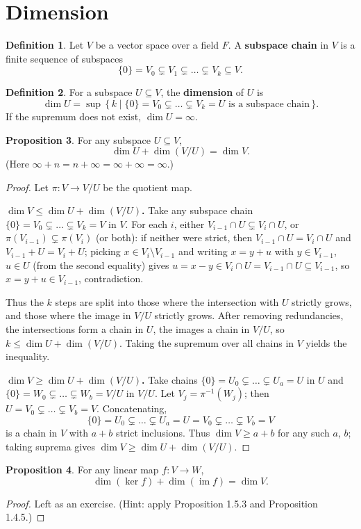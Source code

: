 \documentclass{book}
\theoremstyle{definition}
\newtheorem{definition}{Definition}[section]
\newtheorem{proposition}[definition]{Proposition}
\begin{document}
\section{Dimension}

\begin{definition}
Let $V$ be a vector space over a field $F$. A \textbf{subspace chain} in $V$ is a finite sequence of subspaces
\[
\{0\} = V_{0} \subsetneq V_{1} \subsetneq \dots \subsetneq V_{k} \subseteq V.
\]
\end{definition}

\begin{definition}
For a subspace $U \subseteq V$, the \textbf{dimension} of $U$ is
\[
\dim U = \sup\,\{\,k \mid \{0\} = V_{0} \subsetneq \dots \subsetneq V_{k} = U \text{ is a subspace chain}\,\}.
\]
If the supremum does not exist, $\dim U = \infty$.
\end{definition}

\begin{proposition}
For any subspace $U \subseteq V$,
\[
\dim U + \dim(V / U) = \dim V.
\]
(Here $\infty + n = n + \infty = \infty + \infty = \infty$.)
\end{proposition}

\begin{proof}
Let $\pi \colon V \to V / U$ be the quotient map.

\textbf{$\dim V \le \dim U + \dim(V / U)$.}
Take any subspace chain $\{0\} = V_{0} \subsetneq \dots \subsetneq V_{k} = V$ in $V$.
For each $i$, either $V_{i-1} \cap U \subsetneq V_{i} \cap U$, or
$\pi(V_{i-1}) \subsetneq \pi(V_{i})$ (or both): if neither were strict, then
$V_{i-1} \cap U = V_{i} \cap U$ and $V_{i-1} + U = V_{i} + U$; picking
$x \in V_{i} \setminus V_{i-1}$ and writing $x = y + u$ with $y \in V_{i-1}$,
$u \in U$ (from the second equality) gives $u = x - y \in V_{i} \cap U
= V_{i-1} \cap U \subseteq V_{i-1}$, so $x = y + u \in V_{i-1}$, contradiction.

Thus the $k$ steps are split into those where the intersection with $U$
strictly grows, and those where the image in $V / U$ strictly grows.
After removing redundancies, the intersections form a chain in $U$,
the images a chain in $V / U$, so $k \le \dim U + \dim(V / U)$.
Taking the supremum over all chains in $V$ yields the inequality.

\textbf{$\dim V \ge \dim U + \dim(V / U)$.}
Take chains $\{0\} = U_{0} \subsetneq \dots \subsetneq U_{a} = U$ in $U$ and
$\{0\} = W_{0} \subsetneq \dots \subsetneq W_{b} = V / U$ in $V / U$.
Let $V_{j} = \pi^{-1}(W_{j})$; then $U = V_{0} \subsetneq \dots \subsetneq V_{b} = V$.
Concatenating,
\[
\{0\} = U_{0} \subsetneq \dots \subsetneq U_{a} = U
      = V_{0} \subsetneq \dots \subsetneq V_{b} = V
\]
is a chain in $V$ with $a + b$ strict inclusions.
Thus $\dim V \ge a + b$ for any such $a$, $b$; taking suprema gives
$\dim V \ge \dim U + \dim(V / U)$.
\end{proof}

\begin{proposition}
For any linear map $f \colon V \to W$,
\[
\dim(\ker f) + \dim(\operatorname{im} f) = \dim V.
\]
\end{proposition}

\begin{proof}
Left as an exercise. (Hint: apply Proposition 1.5.3 and Proposition 1.4.5.)
\end{proof}
\end{document}
